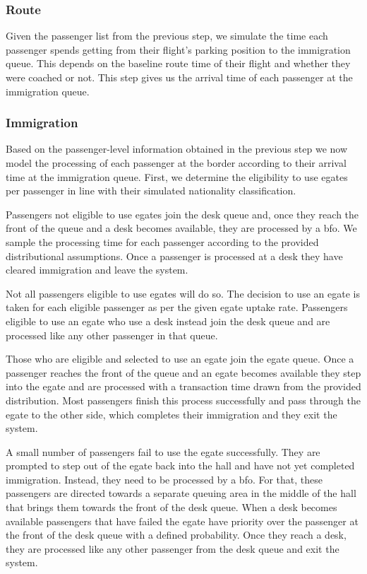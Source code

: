 \documentclass[10pt]{article}
\begin{document}
\subsubsection{Route}

Given the passenger list from the previous step, we simulate the time each passenger spends getting from their flight's parking position to the immigration queue. This depends on the baseline route time 
of their flight and whether they were coached or not. This step gives us the arrival time of each passenger at the immigration queue. 

\subsubsection{Immigration}

Based on the passenger-level information obtained in the previous step we now model the processing of each passenger at the border according to their arrival time at the immigration queue. First, we determine the eligibility to use \glspl{egate} per passenger in line with their simulated nationality classification. 

Passengers not eligible to use \glspl{egate} join the desk queue and, once they reach the front of the queue and a desk becomes available, they are processed by a \gls{bfo}. We sample the processing time for each passenger according to the provided distributional assumptions. Once a passenger is processed at a desk they have cleared immigration and leave the system.

Not all passengers eligible to use \glspl{egate} will do so. The decision to use an \gls{egate} is taken for each eligible passenger as per the given \gls{egate} uptake rate. Passengers eligible to use an \gls{egate} who use a desk instead join the desk queue and are processed like any other passenger in that queue. 

Those who are eligible and selected to use an \gls{egate} join the \gls{egate} queue. Once a passenger reaches the front of the queue and an \gls{egate} becomes available they step into the \gls{egate} and are processed with a transaction time drawn from the provided distribution. Most passengers finish this process successfully and pass through the \gls{egate} to the other side, which completes their immigration and they exit the system.

A small number of passengers fail to use the \gls{egate} successfully. They are prompted to step out of the \gls{egate} back into the hall and have not yet completed immigration. Instead, they need to be processed by a \gls{bfo}. For that, these passengers are directed towards a separate queuing area in the middle of the hall that brings them towards the front of the desk queue. When a desk becomes available passengers that have failed the \gls{egate} have priority over the passenger at the front of the desk queue with a defined probability. Once they reach a desk, they are processed like any other passenger from the desk queue and exit the system.
\end{document}

